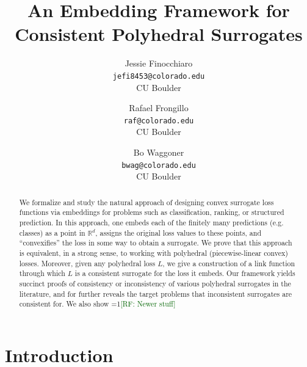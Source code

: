 \documentclass[11pt]{article}
\title{An Embedding Framework for Consistent Polyhedral Surrogates}
\author{%
 Jessie Finocchiaro \\
 \texttt{jefi8453@colorado.edu}\\
 CU Boulder
 \and
 Rafael Frongillo\\
 \texttt{raf@colorado.edu}\\
 CU Boulder
 \and
 Bo Waggoner\\
 \texttt{bwag@colorado.edu}\\
 CU Boulder
}
\newcommand{\Comments}{1}
\newcommand{\mynote}[2]{\ifnum\Comments=1\textcolor{#1}{#2}\fi}
\newcommand{\raf}[1]{\mynote{darkgreen}{[RF: #1]}}
\newcommand{\reals}{\mathbb{R}}
\begin{document}
\maketitle

\begin{abstract}
We formalize and study the natural approach of designing convex surrogate loss functions via embeddings for problems such as classification, ranking, or structured prediction. 
In this approach, one embeds each of the finitely many predictions (e.g. classes) as a point in $\reals^d$, assigns the original loss values to these points, and ``convexifies'' the loss in some way to obtain a surrogate.
We prove that this approach is equivalent, in a strong sense, to working with polyhedral (piecewise-linear convex) losses.
Moreover, given any polyhedral loss $L$, we give a construction of a link function through which $L$ is a consistent surrogate for the loss it embeds.
Our framework yields succinct proofs of consistency or inconsistency of various polyhedral surrogates in the literature, and for further reveals the target problems that inconsistent surrogates are consistent for.
We also show \raf{Newer stuff}
\end{abstract}


\section{Introduction}\label{sec:intro}
\end{document}
